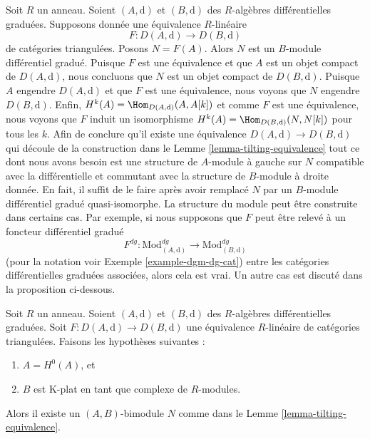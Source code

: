 \begin{remark}
\label{remark-lift-equivalence-to-dga}
Soit $R$ un anneau. Soient $(A, \text{d})$ et $(B, \text{d})$ des $R$-algèbres
différentielles graduées. Supposons donnée une équivalence $R$-linéaire
$$
F : D(A, \text{d}) \longrightarrow D(B, \text{d})
$$
de catégories triangulées. Posons $N = F(A)$. Alors $N$ est un $B$-module
différentiel gradué. Puisque $F$ est une équivalence et que $A$ est un objet
compact de $D(A, \text{d})$, nous concluons que $N$ est un objet compact de $D(B,
\text{d})$. Puisque $A$ engendre $D(A, \text{d})$ et que $F$ est une équivalence,
nous voyons que $N$ engendre $D(B, \text{d})$. Enfin, $H^k(A) = \Hom_{D(A,
\text{d})}(A, A[k])$ et comme $F$ est une équivalence, nous voyons que $F$
induit un isomorphisme $H^k(A) = \Hom_{D(B, \text{d})}(N, N[k])$ pour tous les
$k$. Afin de conclure qu'il existe une équivalence $D(A, \text{d}) \longrightarrow
D(B, \text{d})$ qui découle de la construction dans le Lemme
\ref{lemma-tilting-equivalence}
tout ce dont nous avons besoin est une structure de $A$-module à gauche sur $N$
compatible avec la différentielle et commutant avec la structure de $B$-module à droite
donnée. En fait, il suffit de le faire après avoir remplacé $N$ par un
$B$-module différentiel gradué quasi-isomorphe. La structure du module peut être
construite dans certains cas. Par exemple, si nous supposons que $F$ peut être
relevé à un foncteur différentiel gradué
$$
F^{dg} :
\text{Mod}^{dg}_{(A, \text{d})}
\longrightarrow
\text{Mod}^{dg}_{(B, \text{d})}
$$
(pour la notation voir Exemple \ref{example-dgm-dg-cat}) entre les catégories
différentielles graduées associées, alors cela est vrai. Un autre cas est discuté
dans la proposition ci-dessous.
\end{remark}

\begin{proposition}
\label{proposition-rickard}
Soit $R$ un anneau. Soient $(A, \text{d})$ et $(B, \text{d})$ des $R$-algèbres
différentielles graduées. Soit $F : D(A, \text{d}) \to D(B, \text{d})$ une
équivalence $R$-linéaire de catégories triangulées. Faisons les hypothèses suivantes :
\begin{enumerate}
\item $A = H^0(A)$, et
\item $B$ est K-plat en tant que complexe de $R$-modules.
\end{enumerate}
Alors il existe un $(A, B)$-bimodule $N$ comme dans le Lemme
\ref{lemma-tilting-equivalence}.
\end{proposition}

